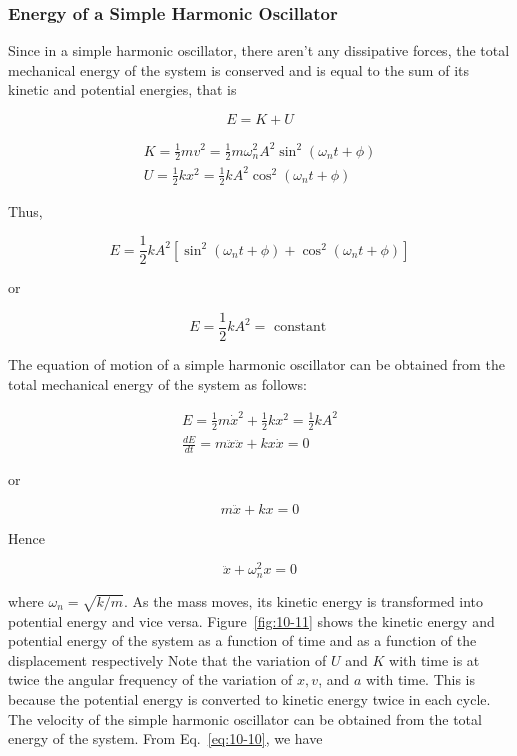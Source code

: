 \documentclass[10pt]{article}
\numberwithin{equation}{section}
\begin{document}
\subsubsection{Energy of a Simple Harmonic Oscillator}\label{sec:10-3-3}
Since in a simple harmonic oscillator, there aren't any dissipative forces, the total mechanical energy of the system is conserved and is equal to the sum of its kinetic and potential energies, that is

$$
E=K+U
$$

$$
\begin{gathered}
K=\frac{1}{2} m v^{2}=\frac{1}{2} m \omega_{n}^{2} A^{2} \sin ^{2}\left(\omega_{n} t+\phi\right) \\
U=\frac{1}{2} k x^{2}=\frac{1}{2} k A^{2} \cos ^{2}\left(\omega_{n} t+\phi\right)
\end{gathered}
$$

Thus,

$$
E=\frac{1}{2} k A^{2}\left[\sin ^{2}\left(\omega_{n} t+\phi\right)+\cos ^{2}\left(\omega_{n} t+\phi\right)\right]
$$

or

$$
E=\frac{1}{2} k A^{2}=\text { constant }
$$

The equation of motion of a simple harmonic oscillator can be obtained from the total mechanical energy of the system as follows:


\begin{gather}
E=\frac{1}{2} m \dot{x}^{2}+\frac{1}{2} k x^{2}=\frac{1}{2} k A^{2}  \label{eq:10-10}\\
\frac{d E}{d t}=m \ddot{x} \ddot{x}+k x \dot{x}=0
\end{gather}


or

$$
m \ddot{x}+k x=0
$$

Hence

$$
\ddot{x}+\omega_{n}^{2} x=0
$$

where $\omega_{n}=\sqrt{k / m}$. As the mass moves, its kinetic energy is transformed into potential energy and vice versa. Figure~\ref{fig:10-11} shows the kinetic energy and potential energy of the system as a function of time and as a function of the displacement respectively Note that the variation of $U$ and $K$ with time is at twice the angular frequency of the variation of $x, v$, and $a$ with time. This is because the potential energy is converted to kinetic energy twice in each cycle. The velocity of the simple harmonic oscillator can be obtained from the total energy of the system. From Eq.~\eqref{eq:10-10}, we have
\end{document}
